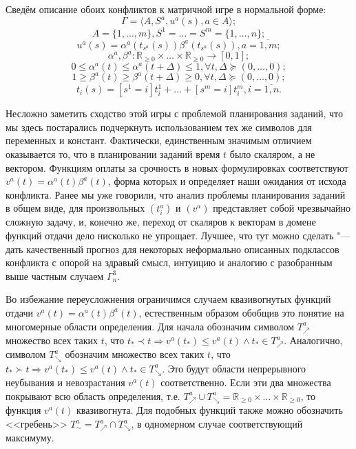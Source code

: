 Сведём описание обоих конфликтов к матричной игре в нормальной форме:
\begin{equation*}
	\Gamma = \langle A, S^a, u^a(s), a \in A \rangle;
\end{equation*}
\begin{equation*}
	A = \{1, \ldots, m\}, S^1 = \ldots = S^m = \{1, \ldots, n\};
\end{equation*}
\begin{equation*}
	u^a(s) = \alpha^a(t_{s^a}(s)) \beta^a(t_{s^a}(s)), a = \overline{1,m};
\end{equation*}
\begin{equation*}
	\alpha^a, \beta^a : \mathbb{R}_{\ge 0} \times \ldots \times \mathbb{R}_{\ge 0} \rightarrow [0, 1];
\end{equation*}
\begin{equation*}
	0 \le \alpha^a(t) \le \alpha^a(t + \Delta) \le 1, \forall t, \Delta \succeq (0, \ldots, 0);
\end{equation*}
\begin{equation*}
	1 \ge \beta^a(t) \ge \beta^a(t + \Delta) \ge 0, \forall t, \Delta \succeq (0, \ldots, 0);
\end{equation*}
\begin{equation*}
	t_i(s) = [s^1 = i] t_i^1 + \ldots + [s^m = i] t_i^m, i = \overline{1,n}.
\end{equation*}

Несложно заметить сходство этой игры с проблемой планирования заданий, что мы здесь постарались подчеркнуть использованием тех же символов для переменных и констант. Фактически, единственным значимым отличием оказывается то, что в планировании заданий время $t$ было скаляром, а не вектором. Функциям оплаты за срочность в новых формулировках соответствуют $v^a(t) = \alpha^a(t) \beta^a(t)$, форма которых и определяет наши ожидания от исхода конфликта. Ранее мы уже говорили, что анализ проблемы планирования заданий в общем виде, для произвольных $(t_i^a)$ и $(v^a)$ представляет собой чрезвычайно сложную задачу, и, конечно же, переход от скаляров к векторам в домене функций отдачи дело нисколько не упрощает. Лучшее, что тут можно сделать "--- дать качественный прогноз для некоторых неформально описанных подклассов конфликта с опорой на здравый смысл, интуицию и аналогию с разобранным выше частным случаем $\Gamma^3_n$.

Во избежание переусложнения ограничимся случаем квазивогнутых функций отдачи $v^a(t) = \alpha^a(t) \beta^a(t)$, естественным образом обобщив это понятие на многомерные области определения. Для начала обозначим символом $T^a_{\nearrow}$ множество всех таких $t$, что $t_* \prec t \Rightarrow v^a(t_*) \le v^a(t) \wedge t_* \in T^a_{\nearrow}$. Аналогично, символом $T^a_{\searrow}$ обозначим множество всех таких $t$, что $t_* \succ t \Rightarrow v^a(t_*) \le v^a(t) \wedge t_* \in T^a_{\searrow}$. Это будут области непрерывного неубывания и невозрастания $v^a(t)$ соответственно. Если эти два множества покрывают всю область определения, т.е. $T^a_{\nearrow} \cup T^a_{\searrow} = \mathbb{R}_{\ge 0} \times \ldots \times \mathbb{R}_{\ge 0}$, то функция $v^a(t)$ квазивогнута. Для подобных функций также можно обозначить <<гребень>> $T^a_{\sim} = T^a_{\nearrow} \cap T^a_{\searrow}$, в одномерном случае соответствующий максимуму.

